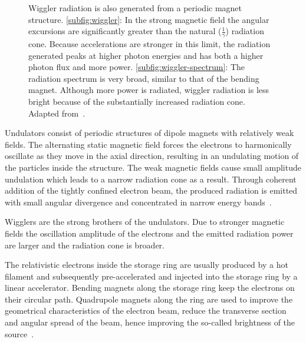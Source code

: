 \begin{figure}
	\noindent{}
	\caption[Wiggler radiation]{Wiggler radiation is also generated from a periodic magnet structure. %
		\ref{subfig:wiggler}: In the strong magnetic field the angular excursions are significantly greater than the natural ($\frac{1}{\gamma}$) radiation cone. Because accelerations are stronger in this limit, the radiation generated peaks at higher photon energies and has both a higher photon flux and more power. %
		\ref{subfig:wiggler-spectrum}: The radiation spectrum is very broad, similar to that of the bending magnet. Although more power is radiated, wiggler radiation is less bright because of the substantially increased radiation cone. Adapted from~\cite{Attwood2007}.}%
	\label{fig:wiggler}
\end{figure}

Undulators consist of periodic structures of dipole magnets with relatively weak fields. The alternating static magnetic field forces the electrons to harmonically oscillate as they move in the axial direction, resulting in an undulating motion of the particles inside the structure. The weak magnetic fields cause small amplitude undulation which leads to a narrow radiation cone as a result. Through coherent addition of the tightly confined electron beam, the produced radiation is emitted with small angular divergence and concentrated in narrow energy bands~\cite{Stampanoni2002a}.

Wigglers are the strong brothers of the undulators. Due to stronger magnetic fields the oscillation amplitude of the electrons and the emitted radiation power are larger and the radiation cone is broader.

The relativistic electrons inside the storage ring are usually produced by a hot filament and subsequently pre-accelerated and injected into the storage ring by a linear accelerator. Bending magnets along the storage ring keep the electrons on their circular path. Quadrupole magnets along the ring are used to improve the geometrical characteristics of the electron beam, \ie reduce the transverse section and angular spread of the beam, hence improving the so-called brightness of the source~\cite{Margaritondo2002}.

